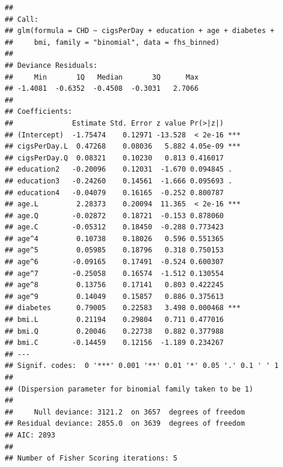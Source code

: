 \documentclass[]{article}
\begin{document}
\begin{verbatim}
## 
## Call:
## glm(formula = CHD ~ cigsPerDay + education + age + diabetes + 
##     bmi, family = "binomial", data = fhs_binned)
## 
## Deviance Residuals: 
##     Min       1Q   Median       3Q      Max  
## -1.4081  -0.6352  -0.4508  -0.3031   2.7066  
## 
## Coefficients:
##              Estimate Std. Error z value Pr(>|z|)    
## (Intercept)  -1.75474    0.12971 -13.528  < 2e-16 ***
## cigsPerDay.L  0.47268    0.08036   5.882 4.05e-09 ***
## cigsPerDay.Q  0.08321    0.10230   0.813 0.416017    
## education2   -0.20096    0.12031  -1.670 0.094845 .  
## education3   -0.24260    0.14561  -1.666 0.095693 .  
## education4   -0.04079    0.16165  -0.252 0.800787    
## age.L         2.28373    0.20094  11.365  < 2e-16 ***
## age.Q        -0.02872    0.18721  -0.153 0.878060    
## age.C        -0.05312    0.18450  -0.288 0.773423    
## age^4         0.10738    0.18026   0.596 0.551365    
## age^5         0.05985    0.18796   0.318 0.750153    
## age^6        -0.09165    0.17491  -0.524 0.600307    
## age^7        -0.25058    0.16574  -1.512 0.130554    
## age^8         0.13756    0.17141   0.803 0.422245    
## age^9         0.14049    0.15857   0.886 0.375613    
## diabetes      0.79005    0.22583   3.498 0.000468 ***
## bmi.L         0.21194    0.29804   0.711 0.477016    
## bmi.Q         0.20046    0.22738   0.882 0.377988    
## bmi.C        -0.14459    0.12156  -1.189 0.234267    
## ---
## Signif. codes:  0 '***' 0.001 '**' 0.01 '*' 0.05 '.' 0.1 ' ' 1
## 
## (Dispersion parameter for binomial family taken to be 1)
## 
##     Null deviance: 3121.2  on 3657  degrees of freedom
## Residual deviance: 2855.0  on 3639  degrees of freedom
## AIC: 2893
## 
## Number of Fisher Scoring iterations: 5
\end{verbatim}
\end{document}
